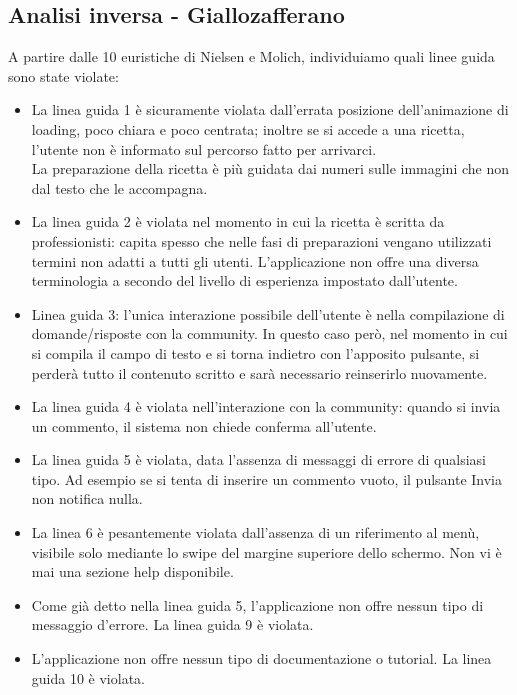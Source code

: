\subsection*{Analisi inversa - Giallozafferano}

A partire dalle 10 euristiche di Nielsen e Molich, individuiamo quali linee guida sono state violate:

\begin{itemize}
\item La linea guida 1 è sicuramente violata dall'errata posizione
dell'animazione di loading, poco chiara e poco centrata; inoltre se si accede a una ricetta, l'utente non è informato sul percorso fatto per arrivarci.\\La preparazione della ricetta è più guidata dai numeri sulle immagini che non dal testo che le accompagna.

\item La linea guida 2 è violata nel momento in cui la ricetta è scritta da professionisti: capita spesso che nelle fasi di preparazioni vengano utilizzati termini non adatti a tutti gli utenti. L'applicazione non offre una diversa terminologia a secondo del livello di esperienza impostato dall'utente.

\item Linea guida 3: l'unica interazione possibile dell'utente è nella compilazione di domande/risposte con la community. In questo caso però, nel momento in cui si compila il campo di testo e si torna indietro con l'apposito pulsante, si perderà tutto il contenuto scritto e sarà necessario reinserirlo nuovamente.

\item La linea guida 4 è violata nell'interazione con la community: quando si invia un commento, il sistema non chiede conferma all'utente.

\item La linea guida 5  è violata, data l'assenza di messaggi di errore di qualsiasi tipo. Ad esempio se si tenta di inserire un commento vuoto, il pulsante Invia non notifica nulla.

\item La linea 6 è pesantemente violata dall'assenza di un riferimento al menù, visibile solo mediante lo swipe del margine superiore dello schermo. Non vi è mai una sezione help disponibile.

\item Come già detto nella linea guida 5, l'applicazione non offre nessun tipo di messaggio d'errore. La linea guida 9 è violata.

\item L'applicazione non offre nessun tipo di documentazione o tutorial. La linea guida 10 è violata.
\end{itemize}

